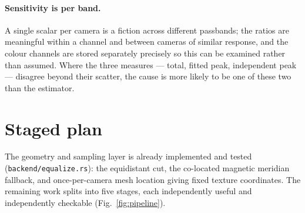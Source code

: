 \documentclass[11pt,a4paper]{article}
\begin{document}
\paragraph{Sensitivity is per band.} A single scalar per camera is a fiction
across different passbands; the ratios are meaningful within a channel and
between cameras of similar response, and the colour channels are stored
separately precisely so this can be examined rather than assumed. Where the
three measures --- total, fitted peak, independent peak --- disagree beyond their
scatter, the cause is more likely to be one of these two than the estimator.

\section{Staged plan}

The geometry and sampling layer is already implemented and tested
(\texttt{backend/equalize.rs}): the equidistant cut, the co-located magnetic
meridian fallback, and once-per-camera mesh location giving fixed texture
coordinates. The remaining work splits into five stages, each independently
useful and independently checkable (Fig.~\ref{fig:pipeline}).
\end{document}

